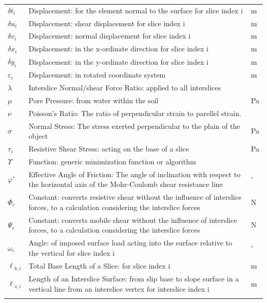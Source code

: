 \documentclass[12pt]{article}
\begin{document}
\begin{longtable*}{l l l}
\\
$\delta{}t_{i}$ & Displacement: for the element normal to the surface for slice index i & m
\\
$\delta{}u_{i}$ & Displacement: shear displacement for slice index i & m
\\
$\delta{}v_{i}$ & Displacement: normal displacement for slice index i & m
\\
$\delta{}x_{i}$ & Displacement: in the x-ordinate direction for slice index i & m
\\
$\delta{}y_{i}$ & Displacement: in the y-ordinate direction for slice index i & m
\\
$\varepsilon{}_{i}$ & Displacement: in rotated coordinate system & m
\\
$\lambda{}$ & Interslice Normal/shear Force Ratio: applied to all interslices & 
\\
$\mu{}$ & Pore Pressure: from water within the soil & Pa
\\
$\nu{}$ & Poisson's Ratio: The ratio of perpendicular strain to parellel strain. & 
\\
$\sigma{}$ & Normal Stress: The stress exerted perpendicular to the plain of the object & Pa
\\
$\tau{}_{i}$ & Resistive Shear Stress: acting on the base of a slice & Pa
\\
$\Upsilon{}$ & Function: generic minimization function or algorithm & 
\\
$\varphi{}'$ & Effective Angle of Friction: The angle of inclination with respect to the horizontal axis of the Mohr-Coulomb shear resistance line & ${}^{\circ}$
\\
$\Phi{}_{c}$ & Constant: converts resistive shear without the influence of interslice forces, to a calculation considering the interslice forces & N
\\
$\Psi{}_{c}$ & Constant: converts mobile shear without the influence of interslice forces, to a calculation considering the interslice forces & N
\\
$\omega{}_{i}$ & Angle: of imposed surface load acting into the surface relative to the vertical for slice index i & ${}^{\circ}$
\\
$\ell{}_{b,i}$ & Total Base Length of a Slice: for slice index i & m
\\
$\ell{}_{s,i}$ & Length of an Interslice Surface: from slip base to slope surface in a vertical line from an interslice vertex for interslice index i & m
\\
\bottomrule
\label{Table:TablofSymb}
\end{longtable*}
\end{document}
